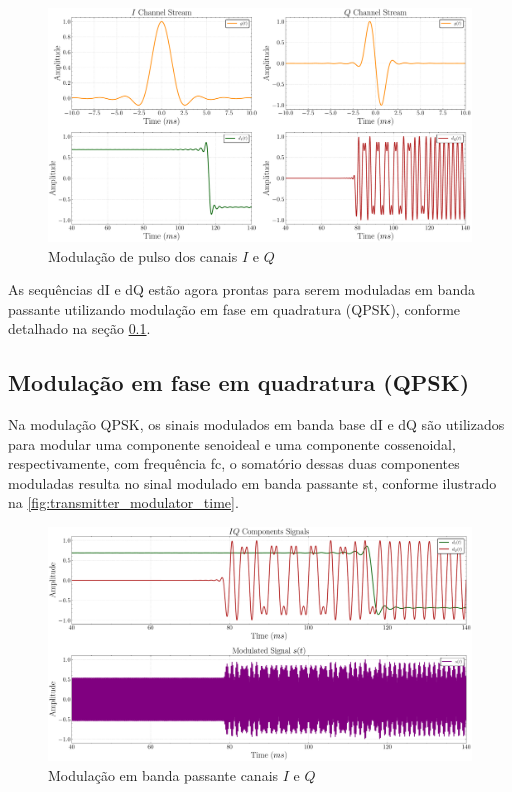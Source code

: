 \begin{figure}[H]
	\centering
	\caption{Modulação de pulso dos canais $I$ e $Q$}\label{fig:transmitter_formatter_time}
	\includegraphics[width=\linewidth]{assets/cap3/transmitter_formatter_time.pdf}
\end{figure}

As sequências \gls{dI} e \gls{dQ} estão agora prontas para serem moduladas em banda passante utilizando modulação em fase em quadratura (\gls{QPSK}), conforme detalhado na seção \ref{sec:qpsk}.

\subsection{Modulação em fase em quadratura (QPSK)}\label{sec:qpsk}

Na modulação \gls{QPSK}, os sinais modulados em banda base \gls{dI} e \gls{dQ} são utilizados para modular uma componente senoideal e uma componente cossenoidal, respectivamente, com frequência \gls{fc}, o somatório dessas duas componentes moduladas resulta no sinal modulado em banda passante \gls{st}, conforme ilustrado na \autoref{fig:transmitter_modulator_time}.

\begin{figure}[H]
	\centering
	\caption{Modulação em banda passante canais $I$ e $Q$}\label{fig:transmitter_modulator_time}
	\includegraphics[width=\linewidth]{assets/cap3/transmitter_modulator_time.pdf}
\end{figure}

